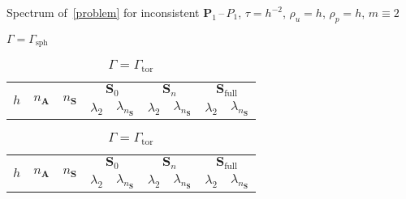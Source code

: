 \documentclass[12pt]{article}
\newcommand{\vect}[1]{\boldsymbol{\mathbf{#1}}}
\newcommand{\sphere}{{\Gamma_{\text{sph}}}}
\newcommand{\tor}{{\Gamma_{\text{tor}}}}
\begin{document}
\begin{table}[h]
	\centering\small
	\caption{Spectrum of~\eqref{problem} for inconsistent $\vect P_1$\,--\,$P_1$, $\tau = h^{-2}$, $\rho_u = h$, $\rho_p = h$, $m \equiv 2$} 
	\label{tab:p1p1}
	\begin{subtable}{1.\linewidth}
		\centering
		\caption{$\Gamma = \sphere$}
		\label{tab:p1p1:sph}
		\begin{tabular}[1.3]{|c|c|c|c|c|c|c|c|c|}
			\hline
			\multirow{2}{*}{$h$} & \multirow{2}{*}{$n_{\vect A}$} & \multirow{2}{*}{$n_{\vect S}$} & \multicolumn{2}{c|}{$\vect S_0$} & \multicolumn{2}{c|}{$\vect S_n$} & \multicolumn{2}{c|}{$\vect S_{\text{full}}$} \\ 
			\cline{4-9}
			& & & $\lambda_2$ & $\lambda_{n_{\vect S}}$ & $\lambda_2$ & $\lambda_{n_{\vect S}}$ & $\lambda_2$ & $\lambda_{n_{\vect S}}$ \\ 
			\hline
			
		\end{tabular}
	\end{subtable}%
	\vskip 2mm
	\begin{subtable}{1.\linewidth}
		\centering
		\caption{$\Gamma = \tor$}
		\label{tab:p1p1:tor}
		\begin{tabular}[1.3]{|c|c|c|c|c|c|c|c|c|}
			\hline
			\multirow{2}{*}{$h$} & \multirow{2}{*}{$n_{\vect A}$} & \multirow{2}{*}{$n_{\vect S}$} & \multicolumn{2}{c|}{$\vect S_0$} & \multicolumn{2}{c|}{$\vect S_n$} & \multicolumn{2}{c|}{$\vect S_{\text{full}}$} \\ 
			\cline{4-9}
			& & & $\lambda_2$ & $\lambda_{n_{\vect S}}$ & $\lambda_2$ & $\lambda_{n_{\vect S}}$ & $\lambda_2$ & $\lambda_{n_{\vect S}}$ \\ 
			\hline
			
		\end{tabular}
	\end{subtable}
\end{table}
\end{document}
